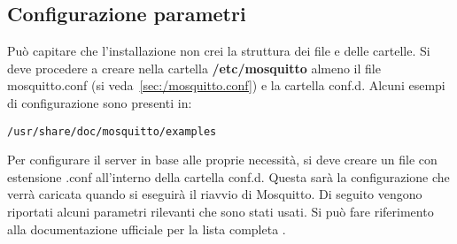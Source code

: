 \subsection{Configurazione parametri}
\label{subsec:broker-esempi-configurazione}
Può capitare che l'installazione non crei la struttura dei file e delle cartelle.
Si deve procedere a creare nella cartella \textbf{/etc/mosquitto} almeno il file
mosquitto.conf (si veda~\ref{sec:/mosquitto.conf}) e la cartella conf.d.\newline
Alcuni esempi di configurazione sono presenti in:
\begin{lstlisting}[language=textnonum]
    /usr/share/doc/mosquitto/examples
\end{lstlisting}
Per configurare il server in base alle proprie necessità, si deve creare un file con estensione .conf
all'interno della cartella conf.d. Questa sarà la configurazione che verrà caricata quando si eseguirà
il riavvio di Mosquitto.\newline
Di seguito vengono riportati alcuni parametri rilevanti che sono stati usati.
Si può fare riferimento alla documentazione ufficiale per la lista completa \cite{mosquitto-par-conf}.
